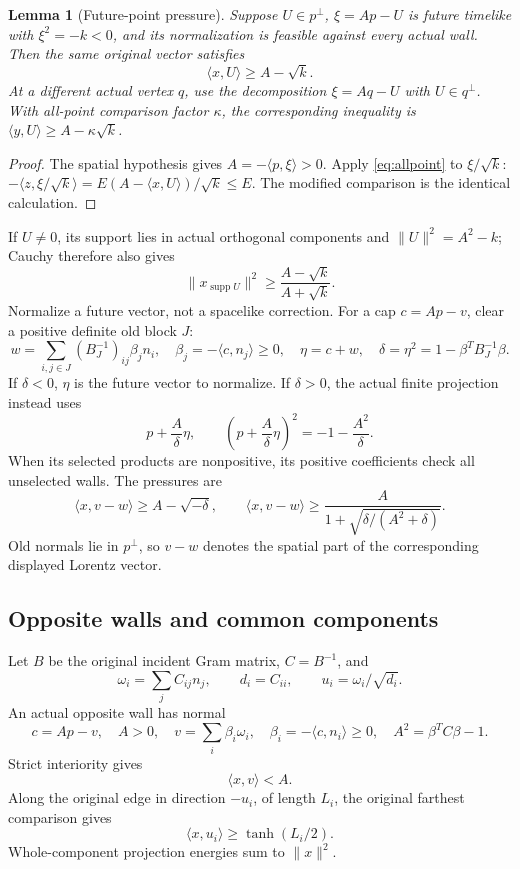 \documentclass[11pt]{article}
\newtheorem{lemma}[theorem]{Lemma}
\theoremstyle{definition}
\theoremstyle{remark}
\newcommand{\ip}[2]{\langle #1,#2\rangle}
\newcommand{\norm}[1]{\lVert #1\rVert}
\begin{document}
\begin{lemma}[Future-point pressure]
\label{lem:pointpressure}
Suppose \(U\in p^\perp\), \(\xi=A p-U\) is future timelike
with \(\xi^2=-k<0\),
and its normalization is feasible against every actual wall.
Then the same original vector satisfies
\[
 \ip{x}{U}\geq A-\sqrt{k}.
\]
At a different actual vertex \(q\), use the decomposition
\(\xi=Aq-U\) with \(U\in q^\perp\). With all-point comparison
factor \(\kappa\), the corresponding inequality is
\(\ip{y}{U}\geq A-\kappa\sqrt{k}\).
\end{lemma}
\begin{proof}
The spatial hypothesis gives \(A=-\ip{p}{\xi}>0\).
Apply \eqref{eq:allpoint} to \(\xi/\sqrt{k}\):
\(-\ip{z}{\xi/\sqrt{k}}=E(A-\ip{x}{U})/\sqrt{k}\leq E\).
The modified comparison is the identical calculation.
\end{proof}
If \(U\ne0\), its support lies in actual orthogonal components
and \(\norm{U}^2=A^2-k\); Cauchy therefore also gives
\begin{equation}\label{eq:pointenergy}
 \norm{x_{\operatorname{supp}U}}^2
 \geq\frac{A-\sqrt{k}}{A+\sqrt{k}}.
\end{equation}
Normalize a future vector, not a spacelike correction.
For a cap \(c=A p-v\), clear a positive definite old block \(J\):
\[
 w=\sum_{i,j\in J}(B_J^{-1})_{ij}\beta_j n_i,\quad
 \beta_j=-\ip{c}{n_j}\geq0,\quad
 \eta=c+w,\quad \delta=\eta^2=1-\beta^TB_J^{-1}\beta.
\]
If \(\delta<0\), \(\eta\) is the future vector to normalize.
If \(\delta>0\), the actual finite projection instead uses
\[
 p+\frac{A}{\delta}\eta,\qquad
 \left(p+\frac{A}{\delta}\eta\right)^2=-1-\frac{A^2}{\delta}.
\]
When its selected products are nonpositive, its positive
coefficients check all unselected walls. The pressures are
\begin{equation}
\label{eq:corepressure}
 \ip{x}{v-w}\geq A-\sqrt{-\delta},\qquad
 \ip{x}{v-w}\geq
 \frac{A}{1+\sqrt{\delta/(A^2+\delta)}}.
\end{equation}
Old normals lie in \(p^\perp\), so \(v-w\) denotes the spatial
part of the corresponding displayed Lorentz vector.

\subsection{Opposite walls and common components}
Let \(B\) be the original incident Gram matrix, \(C=B^{-1}\), and
\[
 \omega_i=\sum_j C_{ij}n_j,\qquad
 d_i=C_{ii},\qquad u_i=\omega_i/\sqrt{d_i}.
\]
An actual opposite wall has normal
\[
 c=A p-v,\quad A>0,\quad
 v=\sum_i\beta_i\omega_i,\quad \beta_i=-\ip{c}{n_i}\geq0,\quad
 A^2=\beta^TC\beta-1.
\]
Strict interiority gives
\begin{equation}\label{eq:actualinterior}
 \ip{x}{v}<A.
\end{equation}
Along the original edge in direction \(-u_i\), of length \(L_i\),
the original farthest comparison gives
\begin{equation}
\label{eq:halfheight}
 \ip{x}{u_i}\geq\tanh(L_i/2).
\end{equation}
Whole-component projection energies sum to \(\norm{x}^2\).
\end{document}
